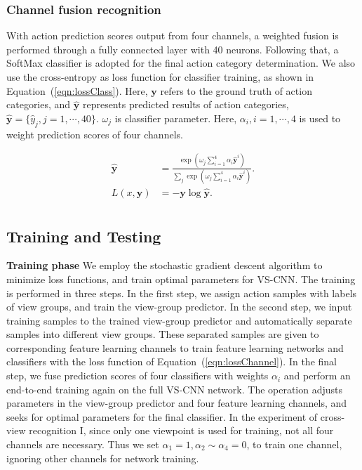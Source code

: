 \documentclass[journal]{IEEEtran}
\begin{document}
\subsubsection{Channel fusion recognition}
With action prediction scores output from four channels, a weighted fusion is performed through a fully connected layer with 40 neurons. Following that, a SoftMax classifier is adopted for the final action category determination. We also use the cross-entropy as loss function for classifier training, as shown in Equation~(\ref{eqn:lossClass}). Here, $\textbf{y}$ refers to the ground truth of action categories, and $\hat{\textbf{y}}$ represents predicted results of action categories, $\hat{\textbf{y}} = \{ \hat{y}_j, j=1, \cdots, 40 \}$. $\omega_j$ is classifier parameter. Here, $\alpha_i, i=1,\cdots, 4$ is used to weight prediction scores of four channels.

\begin{equation}
\begin{aligned}
\hat{\textbf{y}} & = \frac{\exp( \omega_j \sum_{i=1}^4 {\alpha_i \hat{\textbf{y}}^i} ) } { \sum_j \exp( \omega_j \sum_{i=1}^4 {\alpha_i \hat{\textbf{y}}^i} ) }. \\
L(x,\textbf{y}) & = -\textbf{y} \log \hat{\textbf{y}}. \\
\label{eqn:lossClass}
\end{aligned}
\end{equation}

\subsection{Training and Testing}
\textbf{Training phase}
We employ the stochastic gradient descent algorithm to minimize loss functions, and train optimal parameters for VS-CNN. The training is performed in three steps. In the first step, we assign action samples with labels of view groups, and train the view-group predictor. In the second step, we input training samples to the trained view-group predictor and automatically separate samples into different view groups. These separated samples are given to corresponding feature learning channels to train feature learning networks and classifiers with the loss function of Equation~(\ref{eqn:lossChannel}). In the final step, we fuse prediction scores of four classifiers with weights $\alpha_i$ and perform an end-to-end training again on the full VS-CNN network. The operation adjusts parameters in the view-group predictor and four feature learning channels, and seeks for optimal parameters for the final classifier.
In the experiment of cross-view recognition I, since only one viewpoint is used for training, not all four channels are necessary. Thus we set $\alpha_1 =1, \alpha_2 \sim \alpha_4 =0 $, to train one channel, ignoring other channels for network training.
\end{document}
